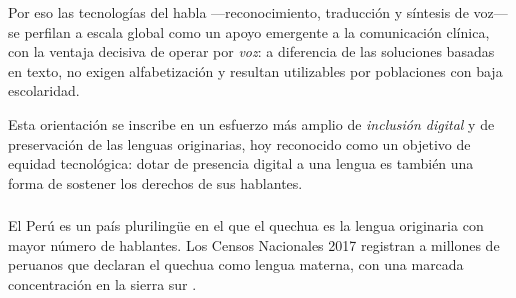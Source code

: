 \begin{bloqueObsDos}
\noindent Por eso
las tecnolog{\'i}as del habla ---reconocimiento, traducci{\'o}n y s{\'i}ntesis de voz--- se perfilan
a escala global como un apoyo emergente a la comunicaci{\'o}n cl{\'i}nica, con la ventaja decisiva de
operar por \emph{voz}: a diferencia de las soluciones basadas en texto, no exigen alfabetizaci{\'o}n
y resultan utilizables por poblaciones con baja escolaridad.

\noindent Esta orientaci{\'o}n se inscribe en un
esfuerzo m{\'a}s amplio de \emph{inclusi{\'o}n digital} y de preservaci{\'o}n de las lenguas
originarias, hoy reconocido como un objetivo de equidad tecnol{\'o}gica: dotar de presencia digital a
una lengua es tambi{\'e}n una forma de sostener los derechos de sus hablantes.
\end{bloqueObsDos}

\subsubsection{}
El Per{\'u} es un pa{\'i}s plurilingüe en el que el quechua es la lengua originaria con mayor
n{\'u}mero de hablantes. Los Censos Nacionales 2017 registran a millones de peruanos que declaran
el quechua como lengua materna, con una marcada concentraci{\'o}n en la sierra sur
\parencite{inei2017}.
